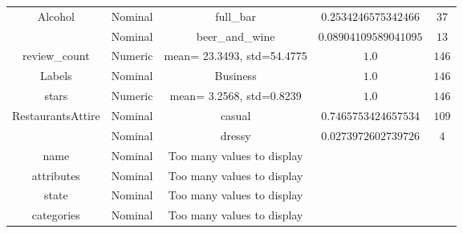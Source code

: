 \begin{tabular}{|c|c|c|c|c|}
\multirow{2}{*}{Alcohol} & Nominal & full_bar & $0.2534246575342466$ & $37$ \\ \cline{2-4} 
 & Nominal & beer_and_wine & $0.08904109589041095$ & $13$ \\ \hline 
\multirow{1}{*}{review_count} & Numeric &  mean= 23.3493, std=54.4775 & $1.0$ & $146$ \\ \hline 
\multirow{1}{*}{Labels} & Nominal & Business & $1.0$ & $146$ \\ \hline 
\multirow{1}{*}{stars} & Numeric &  mean= 3.2568, std=0.8239 & $1.0$ & $146$ \\ \hline 
\multirow{2}{*}{RestaurantsAttire} & Nominal & casual & $0.7465753424657534$ & $109$ \\ \cline{2-4} 
 & Nominal & dressy & $0.0273972602739726$ & $4$ \\ \hline 
name & Nominal & Too many values to display & \\ \hline
attributes & Nominal & Too many values to display & \\ \hline
state & Nominal & Too many values to display & \\ \hline
categories & Nominal & Too many values to display & \\ \hline
\end{tabular}

